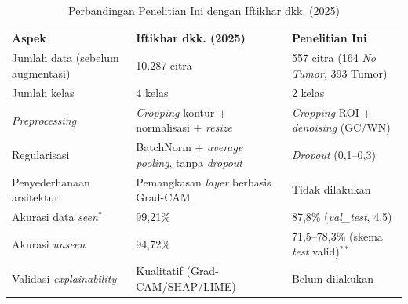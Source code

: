 \begin{table}[H]
	\centering
	\caption{Perbandingan Penelitian Ini dengan Iftikhar dkk. (2025)}
	\begin{tabular}{p{3.2cm}p{4.8cm}p{4.8cm}}
		\hline
		\textbf{Aspek} & \textbf{Iftikhar dkk. (2025)} & \textbf{Penelitian Ini} \\ \hline
		Jumlah data (sebelum augmentasi) & 10.287 citra & 557 citra (164 \textit{No Tumor}, 393 Tumor) \\ \hline
		Jumlah kelas & 4 kelas & 2 kelas \\ \hline
		\textit{Preprocessing} & \textit{Cropping} kontur + normalisasi + \textit{resize} & \textit{Cropping} ROI + \textit{denoising} (GC/WN) \\ \hline
		Regularisasi & BatchNorm + \textit{average pooling}, tanpa \textit{dropout} & \textit{Dropout} (0,1--0,3) \\ \hline
		Penyederhanaan arsitektur & Pemangkasan \textit{layer} berbasis Grad-CAM & Tidak dilakukan \\ \hline
		Akurasi data \textit{seen}$^{*}$ & 99,21\% & 87,8\% (\textit{val\_test}, 4.5) \\ \hline
		Akurasi \textit{unseen} & 94,72\% & 71,5--78,3\% (skema \textit{test} valid)$^{**}$ \\ \hline
		Validasi \textit{explainability} & Kualitatif (Grad-CAM/SHAP/LIME) & Belum dilakukan \\ \hline
	\end{tabular}
\end{table}